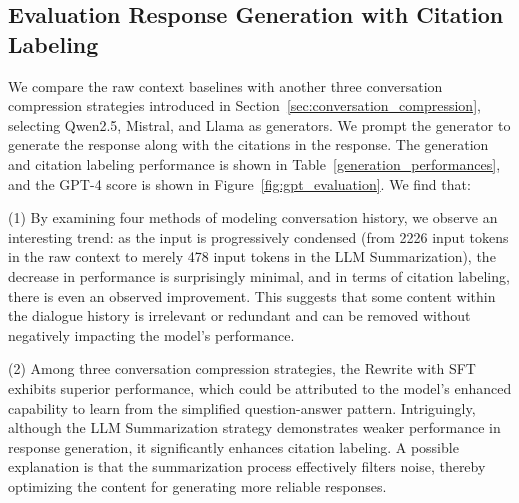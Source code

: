\documentclass[11pt]{article}
\begin{document}







\subsection{Evaluation Response Generation with Citation Labeling}
We compare the raw context baselines with another three conversation compression strategies introduced in Section~\ref{sec:conversation_compression}, selecting Qwen2.5, Mistral, and Llama as generators. We prompt the generator to generate the response along with the citations in the response.
The generation and citation labeling performance is shown in Table~\ref{generation_performances}, and the GPT-4 score is shown in Figure~\ref{fig:gpt_evaluation}. We find that:

(1) By examining four methods of modeling conversation history, we observe an interesting trend: as the input is progressively condensed (from 2226 input tokens in the raw context to merely 478 input tokens in the LLM Summarization), 
the decrease in performance is surprisingly minimal, and in terms of citation labeling, there is even an observed improvement. This suggests that some content within the dialogue history is irrelevant or redundant and can be removed without negatively impacting the model's performance.



(2) Among three conversation compression strategies, the Rewrite with SFT exhibits superior performance, which could be attributed to the model's enhanced capability to learn from the simplified question-answer pattern. Intriguingly, although the LLM Summarization strategy demonstrates weaker performance in response generation, it significantly enhances citation labeling. A possible explanation is that the summarization process effectively filters noise, thereby optimizing the content for generating more reliable responses. 
\end{document}
